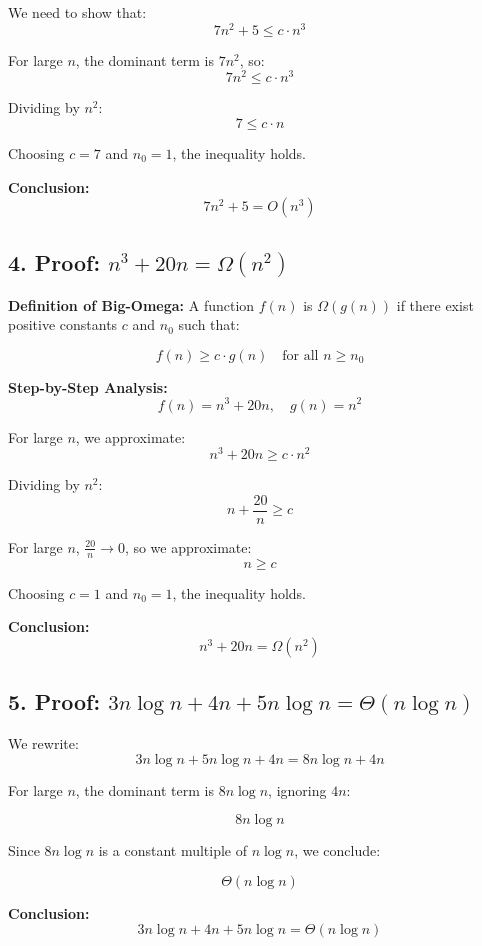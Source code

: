 \documentclass{article}
\begin{document}
We need to show that:
\[
7n^2 + 5 \leq c \cdot n^3
\]

For large \( n \), the dominant term is \( 7n^2 \), so:
\[
7n^2 \leq c \cdot n^3
\]

Dividing by \( n^2 \):
\[
7 \leq c \cdot n
\]

Choosing \( c = 7 \) and \( n_0 = 1 \), the inequality holds.

\textbf{Conclusion:}
\[
7n^2 + 5 = O(n^3)
\]

\subsection*{4. Proof: \( n^3 + 20n = \Omega(n^2) \)}

\textbf{Definition of Big-Omega:}  
A function \( f(n) \) is \( \Omega(g(n)) \) if there exist positive constants \( c \) and \( n_0 \) such that:

\[
f(n) \geq c \cdot g(n) \quad \text{for all } n \geq n_0
\]

\textbf{Step-by-Step Analysis:}
\[
f(n) = n^3 + 20n, \quad g(n) = n^2
\]

For large \( n \), we approximate:
\[
n^3 + 20n \geq c \cdot n^2
\]

Dividing by \( n^2 \):
\[
n + \frac{20}{n} \geq c
\]

For large \( n \), \( \frac{20}{n} \to 0 \), so we approximate:
\[
n \geq c
\]

Choosing \( c = 1 \) and \( n_0 = 1 \), the inequality holds.

\textbf{Conclusion:}
\[
n^3 + 20n = \Omega(n^2)
\]

\subsection*{5. Proof: \( 3n \log n + 4n + 5n \log n = \Theta(n \log n) \)}

We rewrite:
\[
3n \log n + 5n \log n + 4n = 8n \log n + 4n
\]

For large \( n \), the dominant term is \( 8n \log n \), ignoring \( 4n \):

\[
8n \log n
\]

Since \( 8n \log n \) is a constant multiple of \( n \log n \), we conclude:

\[
\Theta(n \log n)
\]

\textbf{Conclusion:}
\[
3n \log n + 4n + 5n \log n = \Theta(n \log n)
\]
\end{document}
